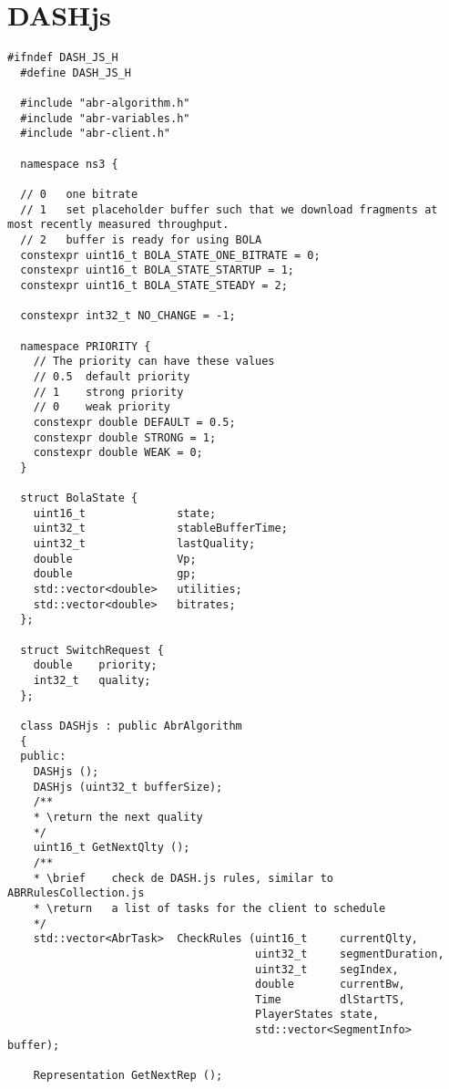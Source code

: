 \section{DASHjs}
\label{sec:dashjs}
\begin{lstlisting}[language=myC++, caption={DASHjs.h}, captionpos=b]
  #ifndef DASH_JS_H
  #define DASH_JS_H
  
  #include "abr-algorithm.h"
  #include "abr-variables.h"
  #include "abr-client.h"
  
  namespace ns3 {
    
  // 0   one bitrate
  // 1   set placeholder buffer such that we download fragments at most recently measured throughput.
  // 2   buffer is ready for using BOLA
  constexpr uint16_t BOLA_STATE_ONE_BITRATE = 0;
  constexpr uint16_t BOLA_STATE_STARTUP = 1;
  constexpr uint16_t BOLA_STATE_STEADY = 2;
  
  constexpr int32_t NO_CHANGE = -1;

  namespace PRIORITY {
    // The priority can have these values
    // 0.5  default priority
    // 1    strong priority
    // 0    weak priority
    constexpr double DEFAULT = 0.5;
    constexpr double STRONG = 1;
    constexpr double WEAK = 0;
  }
  
  struct BolaState {
    uint16_t              state;
    uint32_t              stableBufferTime;
    uint32_t              lastQuality;
    double                Vp;
    double                gp;
    std::vector<double>   utilities;
    std::vector<double>   bitrates;
  };
  
  struct SwitchRequest {
    double    priority;
    int32_t   quality;
  };
  
  class DASHjs : public AbrAlgorithm
  {
  public:
    DASHjs ();
    DASHjs (uint32_t bufferSize);
    /**
    * \return the next quality
    */
    uint16_t GetNextQlty ();
    /**
    * \brief    check de DASH.js rules, similar to ABRRulesCollection.js
    * \return   a list of tasks for the client to schedule
    */
    std::vector<AbrTask>  CheckRules (uint16_t     currentQlty,
                                      uint32_t     segmentDuration,
                                      uint32_t     segIndex,
                                      double       currentBw,
                                      Time         dlStartTS,
                                      PlayerStates state,
                                      std::vector<SegmentInfo> buffer);
  
    Representation GetNextRep ();
  

\end{lstlisting}
